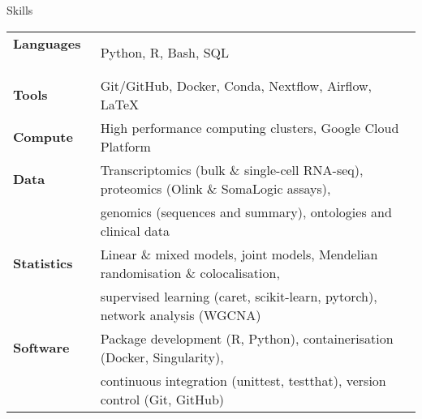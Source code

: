 \documentclass{resume}
\begin{document}
\begin{rSection}{Skills}

\begin{tabular}{ @{} >{\bfseries}l @{\hspace{3ex}} l }
Languages \ & Python, R, Bash, SQL \\ %
Tools \ & Git/GitHub, Docker, Conda, Nextflow, Airflow, \LaTeX \vspace{2pt plus 1pt minus 1pt} \\
Compute \ & High performance computing clusters, Google Cloud Platform \vspace{2pt plus 1pt minus 1pt} \\
Data \ & Transcriptomics (bulk \& single-cell RNA-seq), proteomics (Olink \& SomaLogic assays), \\
     \ & genomics (sequences and summary), ontologies and clinical data \vspace{2pt plus 1pt minus 1pt} \\
Statistics \ & Linear \& mixed models, joint models, Mendelian randomisation \& colocalisation, \\
           \ & supervised learning (caret, scikit-learn, pytorch), network analysis (WGCNA) \vspace{2pt plus 1pt minus 1pt} \\
Software \ & Package development (R, Python), containerisation (Docker, Singularity),   \\
         \ & continuous integration (unittest, testthat), version control (Git, GitHub) \\
\end{tabular}


\end{rSection}
\end{document}
